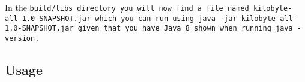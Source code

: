 In the \tt{build/libs} directory you will now find a file named
\tt{kilobyte-all-1.0-SNAPSHOT.jar} which you can run using \tt{java -jar
  kilobyte-all-1.0-SNAPSHOT.jar} given that you have Java 8 shown when running
\tt{java -version}.

\subsection{Usage}





\clearpage

\printbibliography


